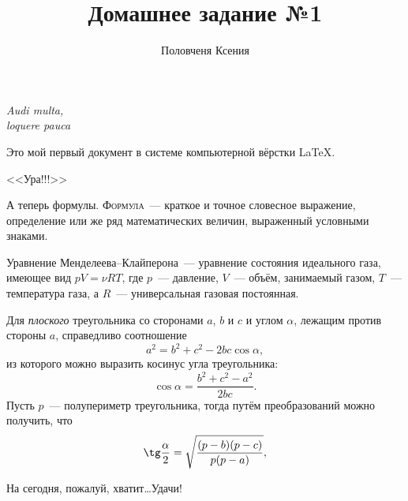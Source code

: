 \documentclass[12pt]{article}
\title{Домашнее задание №1}
\author{Половченя Ксения}
\date{}
\begin{document}
	\maketitle
	\begin{flushright}
		{\itshape Audi multa,\\ loquere pauca}
	\end{flushright}
	\vspace{20pt}
	Это мой первый документ в системе компьютерной вёрстки \LaTeX.
	
	\begin{center}
		{\LARGE \sffamily <<Ура!!!>>}
	\end{center}
	\vspace{15pt}
	
	А теперь формулы. {\scshape Формула}~--- краткое и точное словесное выражение, определение или же ряд математических величин, выраженный условными знаками.
	\vspace{15pt}
	
	\hspace{28pt}{\Large \bfseries Термодинамика}
	
	Уравнение Менделеева--Клайперона~--- уравнение состояния идеального газа, имеющее вид $p V = \nu R T$, где $p$~--- давление,  $V$~--- объём, занимаемый газом, $T$~--- температура газа, а $R$~--- универсальная газовая постоянная.
	\vspace{15pt}
	
	\hspace{28pt}{\Large \bfseries Геометрия \hfill Планиметрия}
	
	Для {\slshape плоского} треугольника со сторонами $a$, $b$ и $c$ и углом $\alpha$, лежащим против стороны $a$, справедливо соотношение 
	$$a^2 = b^2 + c^2 - 2 b c \cos\alpha,$$ из которого можно выразить косинус угла треугольника: $$\cos\alpha = \frac{b^2 + c^2 - a^2}{2 b c}.$$
	Пусть $p$~--- полупериметр треугольника, тогда путём преобразований можно получить, что $$\tg\frac{\alpha}{2} = \sqrt{\frac{(p - b)(p - c)}{p (p - a)}},$$
	
	\vspace{1cm}
	\hspace{0pt} На сегодня, пожалуй, хватит\ldots Удачи!
	
\end{document}
